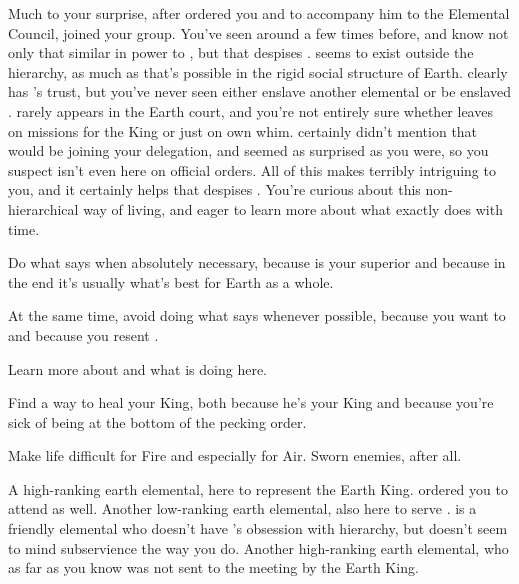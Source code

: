 \documentclass[char]{elementals}
\begin{document}
Much to your surprise, after \cLoyal{} ordered you and \cMinion{} to accompany him to the Elemental Council, \cRogue{\intro} joined your group.  You've seen \cRogue{\them} around a few times before, and know not only that  similar in power to \cLoyal{}, but that \cLoyal{} despises \cRogue{\them}.  \cRogue{} seems to exist outside the hierarchy, as much as that's possible in the rigid social structure of Earth.  \cRogue{\They} clearly has \cEarthKing{}'s trust, but you've never seen \cRogue{\them} either enslave another elemental or be enslaved \cRogue{\themself}.  \cRogue{} rarely appears in the Earth court, and you're not entirely sure whether \cRogue{\they} leaves on missions for the King or just on \cRogue{\their} own whim.  \cEarthKing{} certainly didn't mention that \cRogue{} would be joining your delegation, and \cLoyal{} seemed as surprised as you were, so you suspect \cRogue{} isn't even here on official orders.  All of this makes \cRogue{} terribly intriguing to you, and it certainly helps that \cLoyal{} despises \cRogue{\them}.  You're curious about this non-hierarchical way of living, and eager to learn more about what exactly \cRogue{} does with \cRogue{\their} time.

\begin{itemz}[Goals]
	\item  Do what \cLoyal{} says when absolutely necessary, because \cLoyal{\they} is your superior and because in the end it's usually what's best for Earth as a whole.
	\item  At the same time, avoid doing what \cLoyal{} says whenever possible, because you want to and because you resent \cLoyal{\them}.
	\item  Learn more about \cRogue{} and what \cRogue{\they} is doing here.
  \item  Find a way to heal your King, both because he's your King and because you're sick of being at the bottom of the pecking order.
	\item  Make life difficult for Fire and especially for Air.  Sworn enemies, after all.
\end{itemz}

\begin{contacts}
  \contact{\cLoyal{\intro}} A high-ranking earth elemental, here to represent the Earth King.  \cLoyal{\They} ordered you to attend as well.
	\contact{\cMinion{\intro}} Another low-ranking earth elemental, also here to serve \cLoyal{}.  \cMinion{} is a friendly elemental who doesn't have \cLoyal{}'s obsession with hierarchy, but doesn't seem to mind subservience the way you do.
	\contact{\cRogue{\intro}} Another high-ranking earth elemental, who as far as you know was not sent to the meeting by the Earth King.
\end{contacts} 
\end{document}

